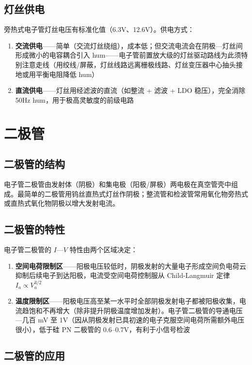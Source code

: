 \documentclass[12pt,UTF8]{ctexbook}
\begin{document}
\subsection{灯丝供电}

旁热式电子管灯丝电压有标准化值（6.3V、12.6V）。供电方式：
\begin{enumerate}
\item \textbf{交流供电}——简单（交流灯丝绕组），成本低；但交流电流会在阴极—灯丝间形成微小的电容耦合引入 hum——电子管前置放大级的灯丝驱动路线为此须特别注意走线（用绞线/屏蔽，灯丝线路远离栅极线路、灯丝变压器中心抽头接地或用平衡电阻降低 hum）
\item \textbf{直流供电}——灯丝用经滤波的直流（如整流 + 滤波 + LDO 稳压），完全消除 50Hz hum，用于极高灵敏度的前级电路
\end{enumerate}

\section{二极管}
\label{sec:tube_diode}

\subsection{二极管的结构}

电子管二极管由发射体（阴极）和集电极（阳极/屏极）两电极在真空管壳中组成。最简单的二极管用钨丝直热式灯丝作阴极；整流管和检波管常用氧化物旁热式或直热式氧化物阴极以增大发射电流。

\subsection{二极管的特性}

电子管二极管的 $I$—$V$ 特性由两个区域决定：
\begin{enumerate}
\item \textbf{空间电荷限制区}——阳极电压较低时，阴极发射的大量电子形成空间负电荷云抑制后续电子到达阳极，电流受空间电荷控制服从 Child-Langmuir 定律 $I_a \propto V_a^{3/2}$
\item \textbf{温度限制区}——阳极电压高至某一水平时全部阴极发射电子都被阳极收集，电流趋饱和不再增大（除非提升阴极温度增加发射）。电子管二极管的导通电压—几百 mV 至 1V（因从阴极发射已具初速的电子克服空间电荷所需额外电压很小），低于硅 PN 二极管的 0.6–0.7V，有利于小信号检波
\end{enumerate}

\subsection{二极管的应用}
\end{document}
